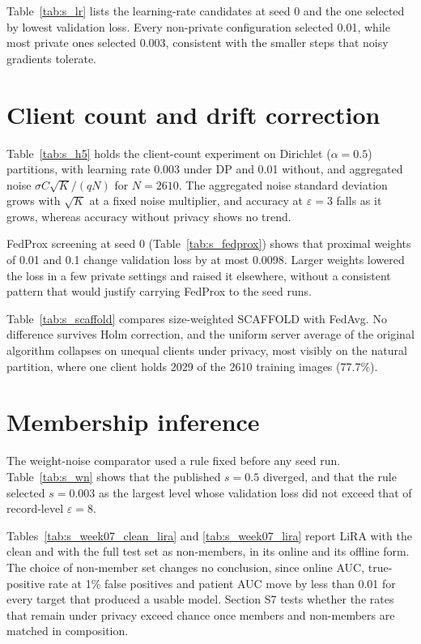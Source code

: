 \documentclass[a4paper,11pt]{article}
\begin{document}


Table~\ref{tab:s_lr} lists the learning-rate candidates at seed 0 and the one selected by lowest validation loss. Every
non-private configuration selected 0.01, while most private ones selected 0.003, consistent with the smaller steps that
noisy gradients tolerate.



\section{Client count and drift correction}
Table~\ref{tab:s_h5} holds the client-count experiment on Dirichlet ($\alpha=0.5$) partitions, with learning rate 0.003
under DP and 0.01 without, and aggregated noise $\sigma C\sqrt{K}/(qN)$ for $N=2610$. The aggregated noise standard deviation grows with $\sqrt{K}$
at a fixed noise multiplier, and accuracy at $\varepsilon=3$ falls as it grows, whereas accuracy without privacy shows
no trend.



FedProx screening at seed 0 (Table~\ref{tab:s_fedprox}) shows that proximal weights of 0.01 and 0.1 change validation
loss by at most 0.0098. Larger weights lowered the loss in a few private settings and raised it elsewhere, without a
consistent pattern that would justify carrying FedProx to the seed runs.



Table~\ref{tab:s_scaffold} compares size-weighted SCAFFOLD with FedAvg. No difference survives Holm correction, and the
uniform server average of the original algorithm collapses on unequal clients under privacy, most visibly on the
natural partition, where one client holds 2029 of the 2610 training images (77.7\%).



\section{Membership inference}
The weight-noise comparator used a rule fixed before any seed run. Table~\ref{tab:s_wn} shows that the published
$s=0.5$ diverged, and that the rule selected $s=0.003$ as the largest level whose validation loss did not exceed that of
record-level $\varepsilon=8$.



Tables~\ref{tab:s_week07_clean_lira} and \ref{tab:s_week07_lira} report LiRA with the clean and with the full test set
as non-members, in its online and its offline form. The choice of non-member set changes no conclusion, since online
AUC, true-positive rate at 1\% false positives and patient AUC move by less than 0.01 for every target that produced a
usable model. Section S7 tests whether the rates that remain under privacy exceed chance once members and non-members
are matched in composition.
\end{document}
